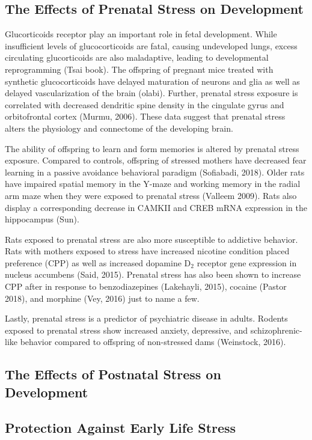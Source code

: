 \documentclass[12pt,twoside]{reedthesis}
\begin{document}
\subsection{The Effects of Prenatal Stress on Development}
Glucorticoids receptor play an important role in fetal development. While
insufficient levels of glucocorticoids are fatal, causing undeveloped lungs,
excess circulating glucorticoids are also maladaptive, leading to developmental
reprogramming (Tsai book). The offspring of pregnant mice treated with synthetic glucocorticoids
 have delayed maturation of neurons and glia as well as delayed vascularization
 of the brain (olabi). Further, prenatal stress exposure is correlated with
 decreased dendritic spine density in the cingulate gyrus and orbitofrontal
 cortex (Murmu, 2006). These data suggest that prenatal stress alters the
 physiology and connectome of the developing brain.

 The ability of offspring to learn and form memories is altered by prenatal
 stress exposure. Compared to controls, offspring of stressed mothers have decreased fear learning in a
 passive avoidance behavioral paradigm (Sofiabadi, 2018). Older rats have impaired spatial memory in the Y-maze and
 working memory in the radial arm maze when they were exposed to prenatal stress
 (Valleem 2009). Rats also display a corresponding
 decrease in CAMKII and CREB mRNA expression in the hippocampus (Sun). 

 Rats exposed to prenatal stress are also more susceptible to addictive behavior.
 Rats with mothers exposed to stress have increased nicotine condition placed
 preference (CPP) as well as increased dopamine D$_2$ receptor gene expression
 in nucleus accumbens (Said, 2015). Prenatal stress has also been shown to
 increase CPP after in response to benzodiazepines (Lakehayli, 2015), cocaine
 (Pastor 2018), and morphine (Vey, 2016) just to name a few.

 Lastly, prenatal stress is a predictor of psychiatric disease in adults.
 Rodents exposed to prenatal stress show increased anxiety, depressive, and
 schizophrenic-like behavior compared to offspring of non-stressed dams
 (Weinstock, 2016). 

\subsection{The Effects of Postnatal Stress on Development}

\subsection{Protection Against Early Life Stress} 
\end{document}

